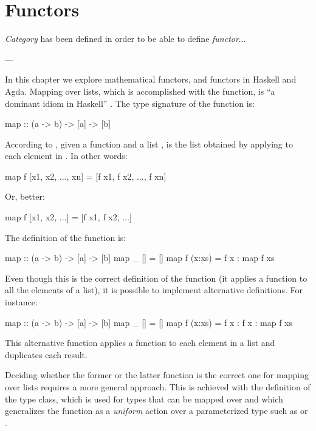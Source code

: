 \chapter{Functors}
\label{chap:functors}

\epigraph{
  \emph{Category} has been defined in order to be able to
  define \emph{functor}...
}{---\textcite[18]{maclane-1998}}

In this chapter we explore mathematical functors, and functors in
Haskell and Agda. Mapping over lists, which is accomplished with the
 function, is ``a dominant idiom in Haskell''
\parencite[146]{lipovaca-2011}. The type signature of the
 function is:
\begin{codehaskell}
map :: (a -> b) -> [a] -> [b]
\end{codehaskell}
According to \parencite[190]{marlow-2010}, given a function
 and a list ,  is
the list obtained by applying  to each element in
. In other words:
\begin{codehaskell}
map f [x1, x2, ..., xn] = [f x1, f x2, ..., f xn]
\end{codehaskell}
Or, better:
\begin{codehaskell}
map f [x1, x2, ...] = [f x1, f x2, ...]
\end{codehaskell}
The definition of the  function is:
\begin{codehaskell}
map :: (a -> b) -> [a] -> [b]
map _ []     = []
map f (x:xs) = f x : map f xs
\end{codehaskell}

Even though this is the correct definition of the 
function (it applies a function to all the elements of a list), it is
possible to implement alternative definitions. For instance:
\begin{codehaskell}
map :: (a -> b) -> [a] -> [b]
map _ []     = []
map f (x:xs) = f x : f x : map f xs
\end{codehaskell}
This alternative  function applies a function to each
element in a list and duplicates each result.

Deciding whether the former or the latter  function
is the correct one for mapping over lists requires a more general
approach. This is achieved with the definition of the
 type class, which is used for types that can be
mapped over and which generalizes the  function as a
\emph{uniform} action over a parameterized type such as
\texthaskell{[a]} or .

